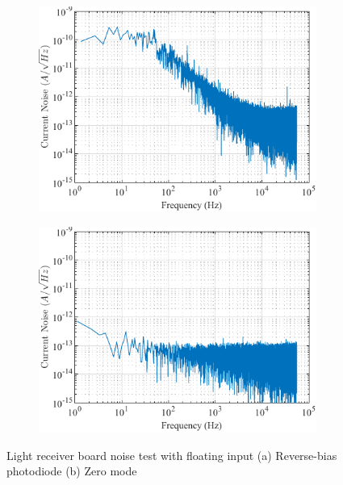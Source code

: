 \begin{figure}[h]
\centering
\begin{subfigure}{.5\textwidth}
  \centering
  \includegraphics[width=1\linewidth]{4-ANC_Sys/NoiseReverseBias.pdf}
  \caption{}
  \label{fig_NoiseReverseBias}
\end{subfigure}%
\begin{subfigure}{.5\textwidth}
  \centering
  \includegraphics[width=1\linewidth]{4-ANC_Sys/NoiseZeroMode.pdf}
  \caption{}
  \label{fig_NoiseZeroMode}
\end{subfigure}
\caption{Light receiver board noise test with floating input (a) Reverse-bias photodiode (b) Zero mode}
\label{fig_RecBoardNoiseTest}
\end{figure}

